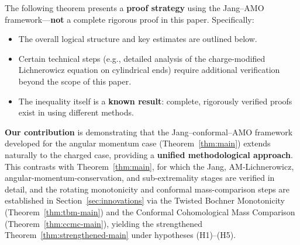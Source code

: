 The following theorem presents a \textbf{proof strategy} using the Jang--AMO framework---\textbf{not} a complete rigorous proof in this paper. Specifically:
\begin{itemize}[leftmargin=1.5em, itemsep=1pt]
    \item The overall logical structure and key estimates are outlined below.
    \item Certain technical steps (e.g., detailed analysis of the charge-modified Lichnerowicz equation on cylindrical ends) require additional verification beyond the scope of this paper.
    \item The inequality itself is a \textbf{known result}: complete, rigorously verified proofs exist in \cite{mars2009, khuri2015charged} using different methods.
\end{itemize}
\textbf{Our contribution} is demonstrating that the Jang--conformal--AMO framework developed for the angular momentum case (Theorem~\ref{thm:main}) extends naturally to the charged case, providing a \textbf{unified methodological approach}. This contrasts with Theorem~\ref{thm:main}, for which the Jang, AM-Lichnerowicz, angular-momentum-conservation, and sub-extremality stages are verified in detail, and the rotating monotonicity and conformal mass-comparison steps are established in Section~\ref{sec:innovations} via the Twisted Bochner Monotonicity (Theorem~\ref{thm:tbm-main}) and the Conformal Cohomological Mass Comparison (Theorem~\ref{thm:ccmc-main}), yielding the strengthened Theorem~\ref{thm:strengthened-main} under hypotheses (H1)--(H5).
